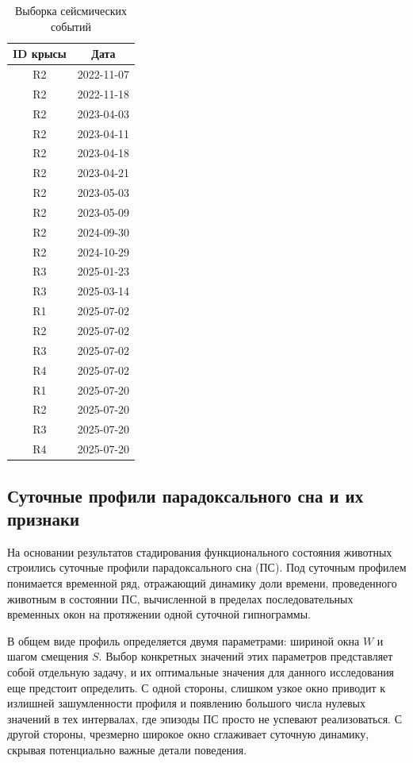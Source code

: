 \documentclass[14pt]{mmcs_article}
\begin{document}
\begin{table}[H]
	\centering
	\caption{Выборка сейсмических событий}
	\label{tab:events}
	\begin{tabular}{|c|c|}
		\hline
		\textbf{ID крысы} & \textbf{Дата} \\
		\hline
		R2 & 2022-11-07 \\
		\hline
		R2 & 2022-11-18 \\
		\hline
		R2 & 2023-04-03 \\
		\hline
		R2 & 2023-04-11 \\
		\hline
		R2 & 2023-04-18 \\
		\hline
		R2 & 2023-04-21 \\
		\hline
		R2 & 2023-05-03 \\
		\hline
		R2 & 2023-05-09 \\
		\hline
		R2 & 2024-09-30 \\
		\hline
		R2 & 2024-10-29 \\
		\hline
		R3 & 2025-01-23 \\
		\hline
		R3 & 2025-03-14 \\
		\hline
		R1 & 2025-07-02 \\
		\hline
		R2 & 2025-07-02 \\
		\hline
		R3 & 2025-07-02 \\
		\hline
		R4 & 2025-07-02 \\
		\hline
		R1 & 2025-07-20 \\
		\hline
		R2 & 2025-07-20 \\
		\hline
		R3 & 2025-07-20 \\
		\hline
		R4 & 2025-07-20 \\
		\hline
	\end{tabular}
\end{table}

\subsection*{Суточные профили парадоксального сна и их признаки}

На основании результатов стадирования функционального состояния животных строились суточные профили парадоксального сна (ПС). Под суточным профилем понимается временной ряд, отражающий динамику доли времени, проведенного животным в состоянии ПС, вычисленной в пределах последовательных временных окон на протяжении одной суточной гипнограммы.

В общем виде профиль определяется двумя параметрами: шириной окна $W$ и шагом смещения $S$. Выбор конкретных значений этих параметров представляет собой отдельную задачу, и их оптимальные значения для данного исследования еще предстоит определить. С одной стороны, слишком узкое окно приводит к излишней зашумленности профиля и появлению большого числа нулевых значений в тех интервалах, где эпизоды ПС просто не успевают реализоваться. С другой стороны, чрезмерно широкое окно сглаживает суточную динамику, скрывая потенциально важные детали поведения.
\end{document}
